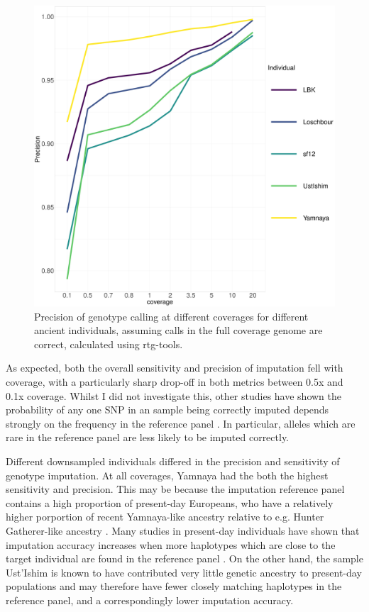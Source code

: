 \begin{figure}[htp]
    \centering
    \includegraphics[width=1.0\textwidth]{../images/chapter1/allDownsampled_rtgtools_Precision.pdf}
    \caption{Precision of genotype calling at different coverages for different ancient individuals, assuming calls in the full coverage genome are correct,  calculated using rtg-tools.}
    \label{fig:precision_downsampled_rtgtools}
\end{figure}

As expected, both the overall sensitivity and precision of imputation fell with coverage, with a particularly sharp drop-off in both metrics between 0.5x and 0.1x coverage. Whilst I did not investigate this, other studies have shown the probability of any one SNP in an sample being correctly imputed depends strongly on the frequency in the reference panel \cite{hui2020evaluating, rubinacci2021efficient}. In particular, alleles which are rare in the reference panel are less likely to be imputed correctly.

Different downsampled individuals differed in the precision and sensitivity of genotype imputation. At all coverages, Yamnaya had the both the highest sensitivity and precision. This may be because the imputation reference panel contains a high proportion of present-day Europeans, who have a relatively higher porportion of recent Yamnaya-like ancestry relative to e.g. Hunter Gatherer-like ancestry \cite{Haak2005}. Many studies in present-day individuals have shown that imputation accuracy increases when more haplotypes which are close to the target individual are found in the reference panel \cite{HUANG2009235, delaneau2018integrative}. On the other hand, the sample Ust'Ishim is known to have contributed very little genetic ancestry to present-day populations \cite{Prufer2014} and may therefore have fewer closely matching haplotypes in the reference panel, and a correspondingly lower imputation accuracy. 

